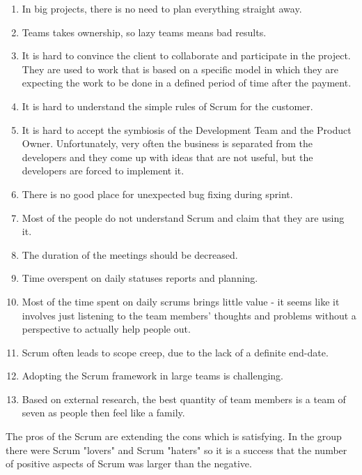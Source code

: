 \begin{enumerate}
    \item In big projects, there is no need to plan everything straight away.
    \item Teams takes ownership, so lazy teams means bad results.
    \item It is hard to convince the client to collaborate and participate in the project. They are used to work that is based on a specific model in which they are expecting the work to be done in a defined period of time after the payment.
    \item It is hard to understand the simple rules of Scrum for the customer.
    \item It is hard to accept the symbiosis of the Development Team and the Product Owner. Unfortunately, very often the business is separated from the developers and they come up with ideas that are not useful, but the developers are forced to implement it. 
    \item There is no good place for unexpected bug fixing during sprint.
    \item Most of the people do not understand Scrum and claim that they are using it.
    \item The duration of the meetings should be decreased.
    \item Time overspent on daily statuses reports and planning.
    \item Most of the time spent on daily scrums brings little value - it seems like it involves just listening to the team members' thoughts and problems without a perspective to actually help people out.
    \item Scrum often leads to scope creep, due to the lack of a definite end-date.
    \item Adopting the Scrum framework in large teams is challenging.
    \item Based on external research, the best quantity of team members is a team of seven as people then feel like a family.
\end{enumerate}

The pros of the Scrum are extending the cons which is satisfying. In the group there were Scrum "lovers" and Scrum "haters" so it is a success that the number of positive aspects of Scrum was larger than the negative.

